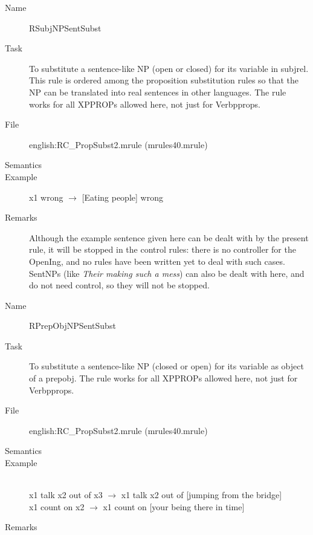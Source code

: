 \begin{description}
\vspace{1 cm}
\begin{description}
\item[Name] RSubjNPSentSubst
\item[Task] To substitute a sentence-like NP (open or closed) for its variable 
in subj\-rel. This rule is ordered among the proposition substitution rules so 
that the NP can be translated into real sentences in other languages. The rule 
works for all XPPROPs allowed here, not just for Verbpprops.
\item[File] english:RC\_PropSubst2.mrule (mrules40.mrule)
\item[Semantics]
\item[Example] x1 wrong $\rightarrow$ [Eating people] wrong
\item[Remarks] Although the example sentence given here can be dealt with by 
the present rule, it will be stopped in the control rules: there is no
controller for the OpenIng, and no rules have been written yet to deal with 
such cases. SentNPs (like {\em Their making such a mess\/}) can also be dealt 
with here, and do not need control, so they will not be stopped. 
\end{description}

\vspace{1 cm}
\begin{description}
\item[Name]   RPrepObjNPSentSubst 
\item[Task] To substitute a sentence-like NP (closed or open) for its variable 
as object of a prepobj. The rule 
works for all XPPROPs allowed here, not just for Verbpprops.
\item[File] english:RC\_PropSubst2.mrule (mrules40.mrule)
\item[Semantics]
\item[Example] \mbox{}\\
x1 talk x2 out of x3 $\rightarrow$ x1 talk x2 out of [jumping from the bridge]
\\
x1 count on x2 $\rightarrow$ x1 count on [your being there in time]
\item[Remarks]
\end{description}


\end{description}
